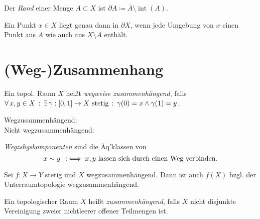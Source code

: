 \documentclass{cheat-sheet}
\DeclareMathOperator{\inte}{int} %
\begin{document}
\begin{samepage}

\begin{defn}
  Der \emph{Rand} einer Menge $A \subset X$ ist $\partial A \coloneqq \overline{A} \setminus \inte(A)$.
\end{defn}

\begin{prop}
  Ein Punkt $x \in X$ liegt genau dann in $\partial X$, wenn jede Umgebung von $x$ einen Punkt aus $A$ wie auch aus $X \setminus A$ enthält.
\end{prop}


\section{(Weg-)Zusammenhang}

\end{samepage}

\begin{defn}
  Ein topol. Raum $X$ heißt \emph{wegweise zusammenhängend}, falls
  $\forall \, {x, y \in X} \,:\, \exists \, {\gamma : \left[ 0, 1 \right] \to X \text{ stetig}} \,:\, \gamma(0) = x \wedge \gamma(1) = y$.
\end{defn}

\begin{bspe}
  Wegzusammenhängend: \enspace
   \enspace
   \\
  Nicht wegzusammenhängend: \enspace
\end{bspe}

\begin{defn}
  \emph{Wegzshgskomponenten} sind die Äq'klassen von
  \[ x \sim y \enspace:\!\iff x, y \text{ lassen sich durch einen Weg verbinden}. \]
\end{defn}

\begin{prop}
  Sei $f : X \to Y$ stetig und $X$ wegzusammenhängend. Dann ist auch $f(X)$ bzgl. der Unterraumtopologie wegzusammenhängend.
\end{prop}

\begin{defn}
  Ein topologischer Raum $X$ heißt \emph{zusammenhängend}, falls $X$ nicht disjunkte Vereinigung zweier nichtleerer offener Teilmengen ist.
\end{defn}
\end{document}
